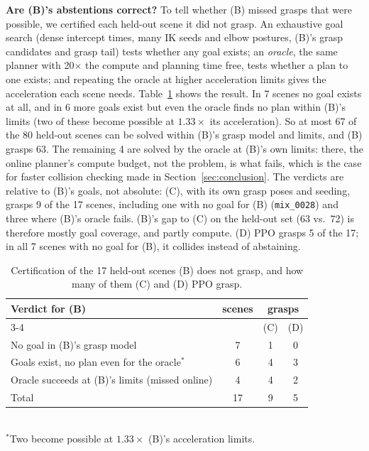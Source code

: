 \documentclass[conference]{IEEEtran}
\begin{document}
\textbf{Are (B)'s abstentions correct?} To tell whether (B) missed grasps that were possible, we certified
each held-out scene it did not grasp. An exhaustive goal search (dense intercept times, many IK seeds and
elbow postures, (B)'s grasp candidates and grasp tail) tests whether any goal exists; an \emph{oracle},
the same planner with 20$\times$ the compute and planning time free, tests whether a plan to one exists;
and repeating the oracle at higher acceleration limits gives the acceleration each scene needs.
Table~\ref{tab:cert} shows the result. In 7 scenes no goal exists at all, and in 6 more goals exist but
even the oracle finds no plan within (B)'s limits (two of these become possible at $1.33\times$ its
acceleration). So at most 67 of the 80 held-out scenes can be solved within (B)'s grasp model and limits,
and (B) grasps 63. The remaining 4 are solved by the oracle at (B)'s own limits: there, the online
planner's compute budget, not the problem, is what fails, which is the case for faster collision checking
made in Section~\ref{sec:conclusion}. The verdicts are relative to (B)'s goals, not absolute: (C), with its
own grasp poses and seeding, grasps 9 of the 17 scenes, including one with no goal for (B)
(\texttt{mix\_0028}) and three where (B)'s oracle fails. (B)'s gap to (C) on the held-out set (63 vs.\ 72)
is therefore mostly goal coverage, and partly compute. (D) PPO grasps 5 of the 17; in all 7 scenes with no goal for (B), it collides instead of abstaining.

\begin{table}[t]
  \centering
  \caption{Certification of the 17 held-out scenes (B) does not grasp, and how many of them (C) and (D) PPO grasp.}
  \label{tab:cert}
  \setlength{\tabcolsep}{4pt}
  \begin{tabular}{@{}lccc@{}}
    \toprule
    Verdict for (B) & scenes & \multicolumn{2}{c}{grasps} \\
    \cmidrule(l){3-4}
    & & (C) & (D) \\
    \midrule
    No goal in (B)'s grasp model                        & 7 & 1 & 0 \\
    Goals exist, no plan even for the oracle$^\ast$      & 6 & 4 & 3 \\
    Oracle succeeds at (B)'s limits (missed online)     & 4 & 4 & 2 \\
    \midrule
    Total                                               & 17 & 9 & 5 \\
    \bottomrule
  \end{tabular}\\[2pt]
  {\footnotesize $^\ast$Two become possible at $1.33\times$ (B)'s acceleration limits.}
\end{table}
\end{document}
